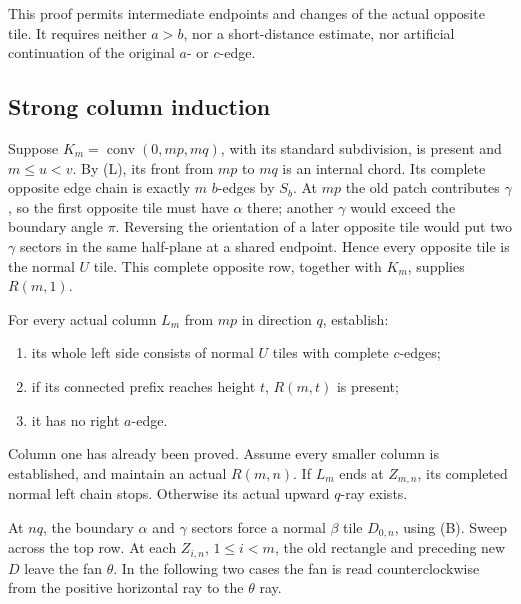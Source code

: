 \documentclass[
  11pt,
  a4paper,
]{article}
\providecommand{\tightlist}{%
  \setlength{\itemsep}{0pt}\setlength{\parskip}{0pt}}
\begin{document}
This proof permits intermediate endpoints and changes of the actual
opposite tile. It requires neither \(a>b\), nor a short-distance
estimate, nor artificial continuation of the original \(a\)- or
\(c\)-edge.

\hypertarget{strong-column-induction}{%
\subsection{Strong column induction}\label{strong-column-induction}}

Suppose \(K_m=\operatorname{conv}(0,mp,mq)\), with its standard
subdivision, is present and \(m\le u<v\). By (L), its front from \(mp\)
to \(mq\) is an internal chord. Its complete opposite edge chain is
exactly \(m\) \(b\)-edges by \(S_b\). At \(mp\) the old patch
contributes \(\gamma\), so the first opposite tile must have \(\alpha\)
there; another \(\gamma\) would exceed the boundary angle \(\pi\). Reversing
the orientation of a later opposite tile would put two \(\gamma\)
sectors in the same half-plane at a shared endpoint. Hence every
opposite tile is the normal \(U\) tile. This complete opposite row,
together with \(K_m\), supplies \(R(m,1)\).

For every actual column \(L_m\) from \(mp\) in direction \(q\),
establish:

\begin{enumerate}
\def\labelenumi{\arabic{enumi}.}
\tightlist
\item
  its whole left side consists of normal \(U\) tiles with complete
  \(c\)-edges;
\item
  if its connected prefix reaches height \(t\), \(R(m,t)\) is present;
\item
  it has no right \(a\)-edge.
\end{enumerate}

Column one has already been proved. Assume every smaller column is
established, and maintain an actual \(R(m,n)\). If \(L_m\) ends at
\(Z_{m,n}\), its completed normal left chain stops. Otherwise its actual
upward \(q\)-ray exists.

At \(nq\), the boundary \(\alpha\) and \(\gamma\) sectors force a normal
\(\beta\) tile \(D_{0,n}\), using (B). Sweep across the top row. At each
\(Z_{i,n}\), \(1\le i<m\), the old rectangle and preceding new \(D\)
leave the fan \(\theta\). In the following two cases the fan is read
counterclockwise from the positive horizontal ray to the \(\theta\) ray.
\end{document}
